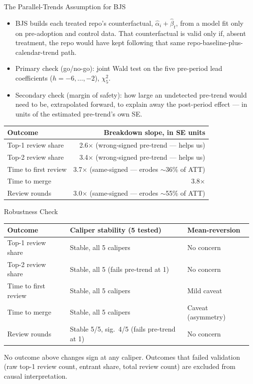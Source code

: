 \begin{frame}{The Parallel-Trends Assumption for BJS}
\begin{itemize}
  \item BJS builds each treated repo's counterfactual,
        $\hat\alpha_i+\hat\beta_t$, from a model fit only on
        pre-adoption and control data. That counterfactual is valid
        only if, absent treatment, the repo would have kept following
        that same repo-baseline-plus-calendar-trend path.
  \item Primary check (go/no-go): joint Wald test on the five
        pre-period lead coefficients ($h=-6,\dots,-2$), $\chi^2_5$.
  \item Secondary check (margin of safety): how large an undetected
        pre-trend would need to be, extrapolated forward, to explain
        away the post-period effect --- in units of the estimated
        pre-trend's own SE.
\end{itemize}
\begin{table}
\centering
\scriptsize
\begin{tabular}{lr}
\toprule
Outcome & Breakdown slope, in SE units \\
\midrule
Top-1 review share     & 2.6$\times$ (wrong-signed pre-trend --- helps us) \\
Top-2 review share     & 3.4$\times$ (wrong-signed pre-trend --- helps us) \\
Time to first review   & 3.7$\times$ (same-signed --- erodes $\sim$36\% of ATT) \\
Time to merge          & 3.8$\times$ \\
Review rounds          & 3.0$\times$ (same-signed --- erodes $\sim$55\% of ATT) \\
\bottomrule
\end{tabular}
\end{table}
\end{frame}

\begin{frame}{Robustness Check}
\begin{table}
\centering
\scriptsize
\begin{tabular}{lll}
\toprule
Outcome & Caliper stability (5 tested) & Mean-reversion \\
\midrule
Top-1 review share     & Stable, all 5 calipers & No concern \\
Top-2 review share     & Stable, all 5 (fails pre-trend at 1) & No concern \\
Time to first review   & Stable, all 5 calipers & Mild caveat \\
Time to merge          & Stable, all 5 calipers & Caveat (asymmetry) \\
Review rounds          & Stable 5/5, sig.\ 4/5 (fails pre-trend at 1) & No concern \\
\bottomrule
\end{tabular}
\end{table}
\vspace{0.5em}
\scriptsize No outcome above changes sign at any caliper. Outcomes that
failed validation (raw top-1 review count, entrant share, total review
count) are excluded from causal interpretation.
\end{frame}

